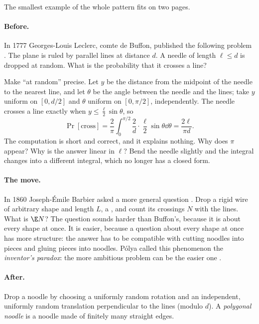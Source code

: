 \begin{refsection}

The smallest example of the whole pattern fits on two pages.

\paragraph{Before.} In 1777 Georges-Louis Leclerc, comte de Buffon, published the following problem \parencite{Buffon1777}. The plane is ruled by parallel lines at distance $d$. A needle of length $\ell\le d$ is dropped at random. What is the probability that it crosses a line?

Make ``at random'' precise. Let $y$ be the distance from the midpoint of the needle to the nearest line, and let $\theta$ be the angle between the needle and the lines; take $y$ uniform on $[0,d/2]$ and $\theta$ uniform on $[0,\pi/2]$, independently. The needle crosses a line exactly when $y\le\frac{\ell}{2}\sin\theta$, so
\[
  \Pr[\text{cross}] = \frac{2}{\pi}\int_0^{\pi/2}\frac{2}{d}\cdot\frac{\ell}{2}\sin\theta\dd\theta = \frac{2\ell}{\pi d}.
\]
The computation is short and correct, and it explains nothing. Why does $\pi$ appear? Why is the answer linear in $\ell$? Bend the needle slightly and the integral changes into a different integral, which no longer has a closed form.

\paragraph{The move.} In 1860 Joseph-\'Emile Barbier asked a more general question \parencite{Barbier1860}. Drop a rigid wire of arbitrary shape and length $L$, a , and count its crossings $N$ with the lines. What is $\E N$? The question sounds harder than Buffon's, because it is about every shape at once. It is easier, because a question about every shape at once has more structure: the answer has to be compatible with cutting noodles into pieces and gluing pieces into noodles. P\'olya called this phenomenon the \emph{inventor's paradox}: the more ambitious problem can be the easier one \parencite{Polya1945}.

\paragraph{After.} Drop a noodle by choosing a uniformly random rotation and an independent, uniformly random translation perpendicular to the lines (modulo $d$). A \emph{polygonal noodle} is a noodle made of finitely many straight edges.


\end{refsection}
